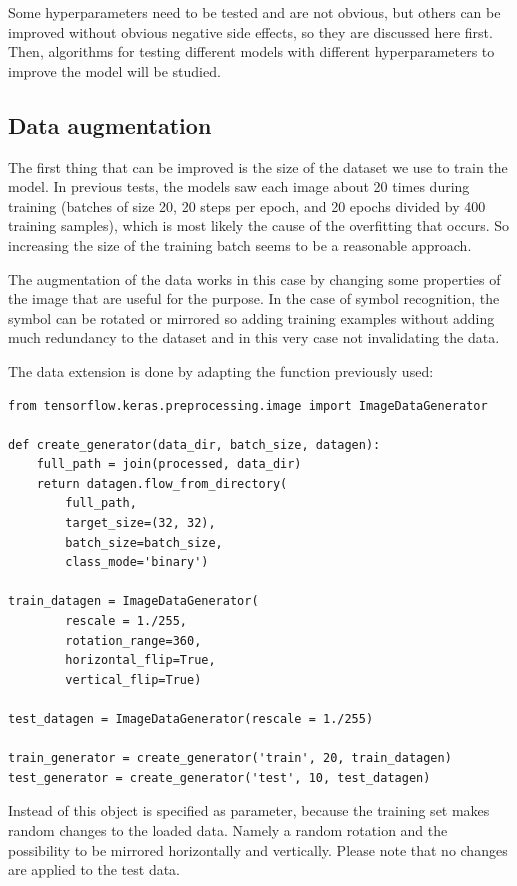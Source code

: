 Some hyperparameters need to be tested and are not obvious, but others can be improved without obvious negative side effects, so they are discussed here first. Then, algorithms for testing different models with different hyperparameters to improve the model will be studied.

\subsection{Data augmentation}\label{ch:data_augmentation}

The first thing that can be improved is the size of the dataset we use to train the model.
In previous tests, the models saw each image about 20 times during training (batches of size 20, 20 steps per epoch, and 20 epochs divided by 400 training samples), which is most likely the cause of the overfitting that occurs.
So increasing the size of the training batch seems to be a reasonable approach.

The augmentation of the data works in this case by changing some properties of the image that are useful for the purpose.
In the case of symbol recognition, the symbol can be rotated or mirrored so adding training examples without adding much redundancy to the dataset and in this very case not invalidating the data.

The data extension is done by adapting the  function previously used:

\begin{lstlisting}
from tensorflow.keras.preprocessing.image import ImageDataGenerator

def create_generator(data_dir, batch_size, datagen):
    full_path = join(processed, data_dir)
    return datagen.flow_from_directory(
        full_path,
        target_size=(32, 32),
        batch_size=batch_size,
        class_mode='binary')

train_datagen = ImageDataGenerator(
        rescale = 1./255,
        rotation_range=360,
        horizontal_flip=True,
        vertical_flip=True)

test_datagen = ImageDataGenerator(rescale = 1./255)

train_generator = create_generator('train', 20, train_datagen)
test_generator = create_generator('test', 10, test_datagen)
\end{lstlisting}

Instead of  this object is specified as parameter, because the training set makes random changes to the loaded data.
Namely a random rotation and the possibility to be mirrored horizontally and vertically.
Please note that no changes are applied to the test data.

